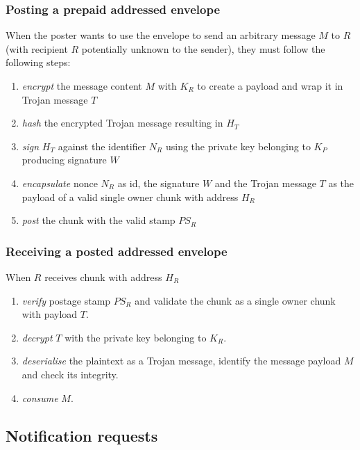 \subsubsection{Posting a prepaid addressed envelope}

When the poster wants to use the envelope to send an arbitrary message $M$ to $R$ (with recipient $R$ potentially unknown to the sender), they must follow the following steps:

\begin{enumerate}
\item \emph{encrypt} the message content $M$ with $K_R$ to create a payload and wrap it in Trojan message $T$
\item \emph{hash} the encrypted Trojan message resulting in $H_T$
\item \emph{sign} $H_T$ against the identifier $N_R$ using the private key belonging to $K_P$ producing signature $W$
\item \emph{encapsulate} nonce $N_R$ as id, the signature $W$ and the Trojan message $T$ as the payload of a valid single owner chunk with address $H_R$
\item \emph{post} the chunk with the valid stamp $PS_R$
\end{enumerate}

\subsubsection{Receiving a posted addressed envelope}

When $R$ receives chunk with address $H_R$

\begin{enumerate}
\item \emph{verify} postage stamp $PS_R$ and validate the chunk as a single owner chunk with payload $T$.
\item \emph{decrypt} $T$ with the private key belonging to $K_R$.
\item \emph{deserialise} the plaintext as a Trojan message, identify the message payload $M$ and check its integrity.
\item \emph{consume} $M$.
\end{enumerate}

\subsection{Notification requests\statusgreen}\label{sec:notification-requests} 



